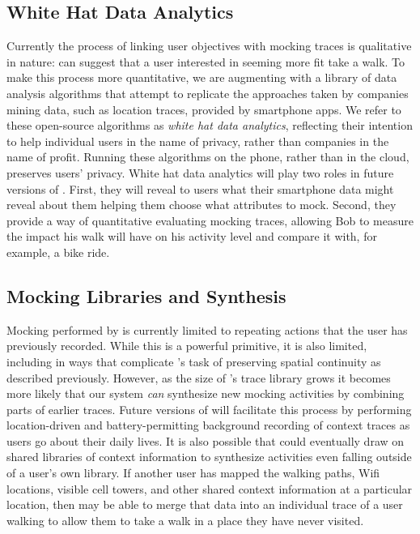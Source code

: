 \subsection{White Hat Data Analytics}

Currently the process of linking user objectives with mocking traces is
qualitative in nature: \PocketMocker{} can suggest that a user interested in
seeming more fit take a walk. To make this process more quantitative, we are
augmenting \PocketMocker{} with a library of data analysis algorithms that
attempt to replicate the approaches taken by companies mining data, such as
location traces, provided by smartphone apps. We refer to these
open-source algorithms as \textit{white hat data analytics}, reflecting their
intention to help individual users in the name of privacy, rather than
companies in the name of profit. Running these algorithms on the phone,
rather than in the cloud, preserves users' privacy. White hat data analytics
will play two roles in future versions of \PocketMocker{}. First, they will
reveal to users what their smartphone data might reveal about them helping
them choose what attributes to mock. Second, they provide a way of
quantitative evaluating mocking traces, allowing Bob to measure the impact
his walk will have on his activity level and compare it with, for example, a
bike ride.

\subsection{Mocking Libraries and Synthesis}

Mocking performed by \PocketMocker{} is currently limited to repeating
actions that the user has previously recorded. While this is a powerful
primitive, it is also limited, including in ways that complicate
\PocketMocker{}'s task of preserving spatial continuity as described
previously. However, as the size of \PocketMocker{}'s trace library grows it
becomes more likely that our system \textit{can} synthesize new mocking
activities by combining parts of earlier traces. Future versions of
\PocketMocker{} will facilitate this process by performing location-driven
and battery-permitting background recording of context traces as users go
about their daily lives. It is also possible that \PocketMocker{} could
eventually draw on shared libraries of context information to synthesize
activities even falling outside of a user's own library. If another
\PocketMocker{} user has mapped the walking paths, Wifi locations, visible
cell towers, and other shared context information at a particular location,
then \PocketMocker{} may be able to merge that data into an individual trace
of a user walking to allow them to take a walk in a place they have never
visited.

